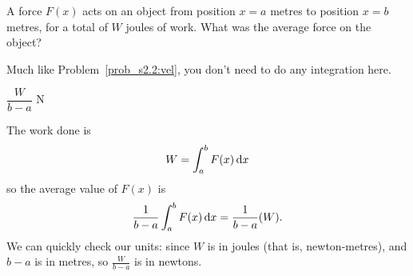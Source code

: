 \begin{question}
A force $F(x)$ acts on an object from position $x=a$ metres to position $x=b$ metres, for a total of $W$ joules of work. What was the average force on the object?
\end{question}
\begin{hint}
Much like Problem~\ref{prob_s2.2:vel}, you don't need to do any integration here.
\end{hint}
\begin{answer}
$\dfrac{W}{b-a}$ N
\end{answer}
\begin{solution}
The work done is
\[W=\int_a^b F(x)\,\mathrm{d}x\]
so the average value of $F(x)$ is
\[\frac{1}{b-a}\int_a^b F(x)\,\mathrm{d}x =\frac{1}{b-a}(W).\]
We can quickly check our units: since $W$ is in joules  (that is, newton-metres), and $b-a$ is in metres, so $\frac{W}{b-a}$ is in newtons.

\end{solution}

